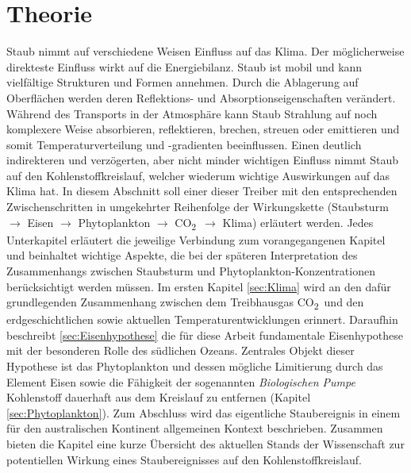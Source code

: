 \documentclass[12pt,a4paper,onecolumn]{scrartcl}
\newcommand{\cotwo}{CO\textsubscript{2}}
\begin{document}
\section{Theorie} \label{sec:Theorie}
Staub nimmt auf verschiedene Weisen Einfluss auf das Klima. Der möglicherweise direkteste Einfluss wirkt auf die Energiebilanz. Staub ist mobil und kann vielfältige Strukturen und Formen annehmen. Durch die Ablagerung auf Oberflächen werden deren Reflektions- und Absorptionseigenschaften verändert. Während des Transports in der Atmosphäre kann Staub Strahlung auf noch komplexere Weise absorbieren, reflektieren, brechen, streuen oder emittieren \citep{Shao.2011} und somit Temperaturverteilung und -gradienten beeinflussen. Einen deutlich indirekteren und verzögerten, aber nicht minder wichtigen Einfluss nimmt Staub auf den Kohlenstoffkreislauf, welcher wiederum wichtige Auswirkungen auf das Klima hat. In diesem Abschnitt soll einer dieser Treiber mit den entsprechenden Zwischenschritten in umgekehrter Reihenfolge der Wirkungskette (Staubsturm $\rightarrow$ Eisen $\rightarrow$ Phytoplankton $\rightarrow$ \cotwo \ $\rightarrow$ Klima) erläutert werden. Jedes Unterkapitel erläutert die jeweilige Verbindung zum vorangegangenen Kapitel und beinhaltet wichtige Aspekte, die bei der späteren Interpretation des Zusammenhangs zwischen Staubsturm und Phytoplankton-Konzentrationen berücksichtigt werden müssen. Im ersten Kapitel \ref{sec:Klima} wird an den dafür grundlegenden Zusammenhang zwischen dem Treibhausgas \cotwo \ und den erdgeschichtlichen sowie aktuellen Temperaturentwicklungen erinnert. Daraufhin beschreibt \ref{sec:Eisenhypothese} die für diese Arbeit fundamentale Eisenhypothese mit der besonderen Rolle des südlichen Ozeans. Zentrales Objekt dieser Hypothese ist das Phytoplankton und dessen mögliche Limitierung durch das Element Eisen sowie die Fähigkeit der sogenannten \textit{Biologischen Pumpe} Kohlenstoff dauerhaft aus dem Kreislauf zu entfernen (Kapitel \ref{sec:Phytoplankton}). Zum Abschluss wird das eigentliche Staubereignis in einem für den australischen Kontinent allgemeinen Kontext beschrieben. Zusammen bieten die Kapitel eine kurze Übersicht des aktuellen Stands der Wissenschaft zur potentiellen Wirkung eines Staubereignisses auf den Kohlenstoffkreislauf.
\end{document}
